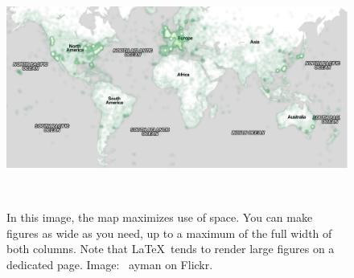 \documentclass{sigchi}
\begin{document}
\begin{figure} \centering \includegraphics[width=1.75\columnwidth]{figures/map}
\caption{In this image, the map maximizes use of space. You can make figures as
wide as you need, up to a maximum of the full width of both columns. Note that
\LaTeX\ tends to render large figures on a dedicated page. Image: \ccbynd~ayman
on Flickr.}~\label{fig:figure2} \end{figure}
\end{document}
